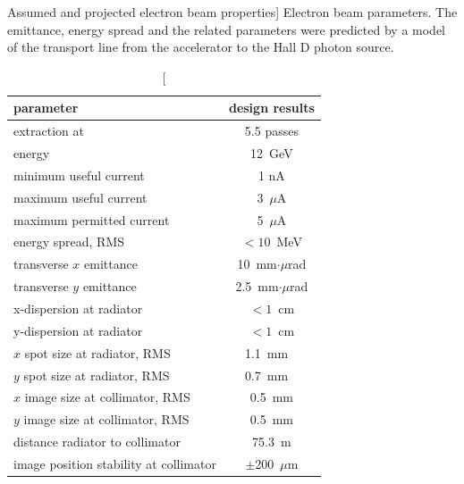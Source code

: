 \begin{table}[ht!]
\begin{center}
\caption
[Assumed and projected electron beam properties]
{Electron beam parameters. The emittance, energy spread and
the related parameters were
predicted by a model of the transport line from
the accelerator to the Hall D photon source. }
\label{tab:elecprop}
\begin{tabular}{|l|c|}
\hline\hline
parameter & design results \\
\hline
extraction at & 5.5 passes \\
energy & 12~GeV \\
minimum useful current & 1 nA \\
maximum useful current & 3~$\mu$A \\
maximum permitted current & 5~$\mu$A \\
energy spread, RMS & $<10$~MeV \\
transverse $x$ emittance & 10~mm$\cdot\mu$rad \\
transverse $y$ emittance & 2.5~mm$\cdot\mu$rad \\
x-dispersion at radiator & $< 1$~cm \\
y-dispersion at radiator & $< 1$~cm \\
$x$ spot size at radiator, RMS & 1.1~mm \ \\
$y$ spot size at radiator, RMS & 0.7~mm \ \\
$x$ image size at collimator, RMS & 0.5~mm \\
$y$ image size at collimator, RMS & 0.5~mm \\
distance radiator to collimator & 75.3~m \\
image position stability at collimator & $\pm$200~$\mu$m \\
\hline\hline
\end{tabular}
\end{center}
\end{table}


